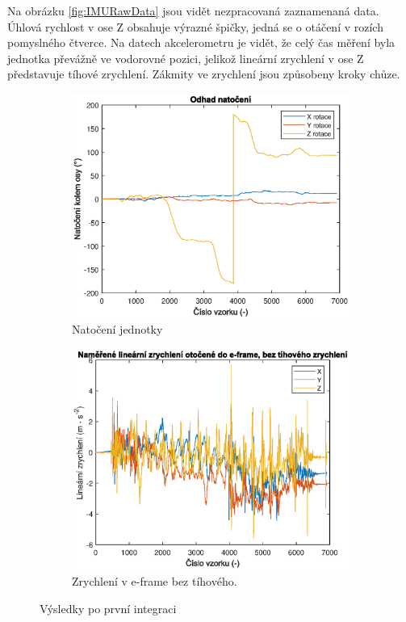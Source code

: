 Na obrázku \ref{fig:IMURawData} jsou vidět nezpracovaná zaznamenaná data. Úhlová rychlost v ose Z obsahuje výrazné špičky, jedná se o otáčení v rozích pomyslného čtverce. Na datech akcelerometru je vidět, že celý čas měření byla jednotka převážně ve vodorovné pozici, jelikož lineární zrychlení v ose Z představuje tíhové zrychlení. Zákmity ve zrychlení jsou způsobeny kroky chůze.

\begin{figure}[h]
     \centering
     \begin{subfigure}[b]{0.49\textwidth}
         \centering
         \includegraphics[width=\textwidth]{obrazky/matlab/1measOrient}
         \caption{Natočení jednotky}   
         \label{fig:Rotation}  
     \end{subfigure}
     \hfill
     \centering
     \begin{subfigure}[b]{0.49\textwidth}
         \centering
         \includegraphics[width=\textwidth]{obrazky/matlab/1measAccelEframeWithoutG}
         \caption{Zrychlení v e-frame bez tíhového.}   
         \label{fig:AccelWithoutG}  
     \end{subfigure}

        \caption{Výsledky po první integraci}
        \label{fig:rotationAccel}
\end{figure}

